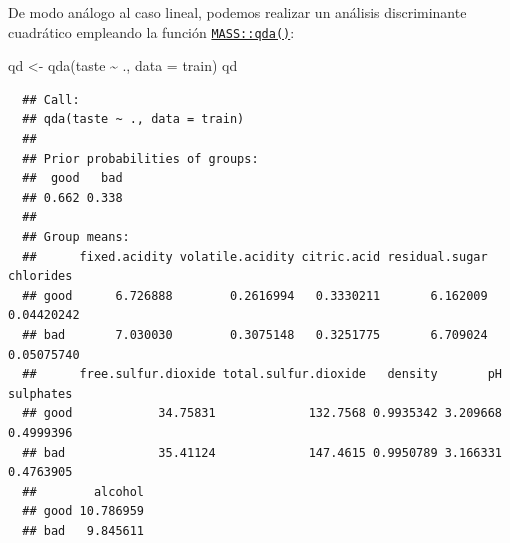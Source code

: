 \documentclass[
]{book}
\newenvironment{Shaded}{\begin{snugshade}}{\end{snugshade}}
\newcommand{\AttributeTok}[1]{\textcolor[rgb]{0.77,0.63,0.00}{#1}}
\newcommand{\CommentTok}[1]{\textcolor[rgb]{0.56,0.35,0.01}{\textit{#1}}}
\newcommand{\FunctionTok}[1]{\textcolor[rgb]{0.00,0.00,0.00}{#1}}
\newcommand{\NormalTok}[1]{#1}
\newcommand{\OtherTok}[1]{\textcolor[rgb]{0.56,0.35,0.01}{#1}}
\newcommand{\SpecialCharTok}[1]{\textcolor[rgb]{0.00,0.00,0.00}{#1}}
\theoremstyle{break}
\theoremstyle{nonumberplain}
\renewcommand{\CommentTok}[1]{\textcolor[rgb]{0.41,0.41,0.41}{\texttt{#1}}}
\begin{document}
De modo análogo al caso lineal, podemos realizar un análisis discriminante cuadrático empleando la función \href{https://rdrr.io/pkg/MASS/man/qda.html}{\texttt{MASS::qda()}}:

\begin{Shaded}
\begin{Highlighting}[]
\NormalTok{qd }\OtherTok{\textless{}{-}} \FunctionTok{qda}\NormalTok{(taste }\SpecialCharTok{\textasciitilde{}}\NormalTok{ ., }\AttributeTok{data =}\NormalTok{ train)}
\NormalTok{qd}
\end{Highlighting}
\end{Shaded}

\begin{verbatim}
  ## Call:
  ## qda(taste ~ ., data = train)
  ## 
  ## Prior probabilities of groups:
  ##  good   bad 
  ## 0.662 0.338 
  ## 
  ## Group means:
  ##      fixed.acidity volatile.acidity citric.acid residual.sugar  chlorides
  ## good      6.726888        0.2616994   0.3330211       6.162009 0.04420242
  ## bad       7.030030        0.3075148   0.3251775       6.709024 0.05075740
  ##      free.sulfur.dioxide total.sulfur.dioxide   density       pH sulphates
  ## good            34.75831             132.7568 0.9935342 3.209668 0.4999396
  ## bad             35.41124             147.4615 0.9950789 3.166331 0.4763905
  ##        alcohol
  ## good 10.786959
  ## bad   9.845611
\end{verbatim}

\begin{Shaded}
\end{Shaded}
\end{document}

